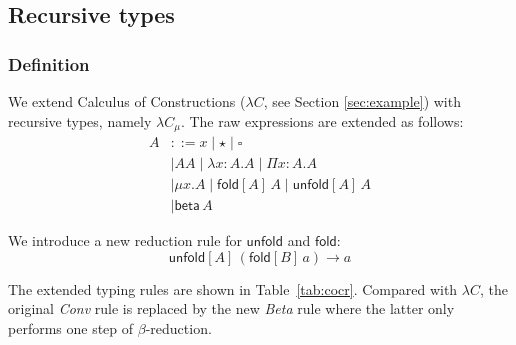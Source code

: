 \documentclass[oneside,a4paper]{article}
\numberwithin{equation}{section}
\newcommand{\fold}[2]{\mathsf{fold}[#1]\,#2}
\newcommand{\unfold}[2]{\mathsf{unfold}[#1]\,#2}
\newcommand{\betaa}[1]{\mathsf{beta}\,#1}
\begin{document}
\begin{comment}
    (Conv) &
             \AxiomC{$\Gamma \vdash_{c} a:A$}
             \AxiomC{$\Gamma \vdash_{c} B:s$}
             \AxiomC{$A=_{\beta c} B$}
             \TrinaryInfC{$\Gamma \vdash_{c} a:B$}
             \DisplayProof
  \end{tabular}
\end{table}
the $(Conv)$ rule is extended with reduction of case expressions.

In the $(Case)$ rule, the first premise binds the actual type
constructor arguments to $\vec{\mathbf{u^{\prime}}}$. The second
premise derives the types of the data constructor arguments
$\vec{\mathbf{t}}_j$ and binds them to $\vec{\mathbf{\alpha}}_{j}$,
using the data constructor $K_{j}$ and the actual type constructor
arguments. The third premise checks whether the types of the right
hand sides, instantiated to the actual type constructor arguments, are
equal, and if so the result type is bound to $t$. Finally, the forth
premise checks whether the derived type $t$ is well formed.

\end{comment}

\subsection{Recursive types}

\subsubsection{Definition}
We extend Calculus of Constructions ($\lambda C$, see Section
\ref{sec:example}) with recursive types, namely $\lambda C_{\mu}$.
The raw expressions are extended as follows:
\begin{align*}
  A &::= x \mid \star \mid \square \\
    &\mid AA \mid \lambda x:A.A \mid \Pi x:A.A \\
    & \mid \mu x.A \mid \fold{A}{A} \mid \unfold{A}{A} \\
    & \mid \betaa{A}
\end{align*}

We introduce a new reduction rule for $\mathsf{unfold}$ and
$\mathsf{fold}$:
\[\unfold{A}{(\fold{B}{a})} \to a\]

The extended typing rules are shown in Table~\ref{tab:cocr}. Compared
with $\lambda C$, the original \emph{Conv} rule is replaced by the new
\emph{Beta} rule where the latter only performs one step of
$\beta$-reduction.
\end{document}
